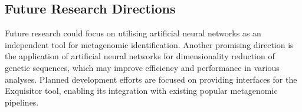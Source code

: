 \documentclass[biomedinformatics,article,submit,moreauthors]{Definitions/mdpi}
\begin{document}
        \subsection{Future Research Directions}
            Future research could focus on utilising artificial neural networks as an independent tool for metagenomic identification. Another promising direction is the application of artificial neural networks for dimensionality reduction of genetic sequences, which may improve efficiency and performance in various analyses.
            Planned development efforts are focused on providing interfaces for the Exquisitor tool, enabling its integration with existing popular metagenomic pipelines.

\vspace{6pt}




\end{document}
